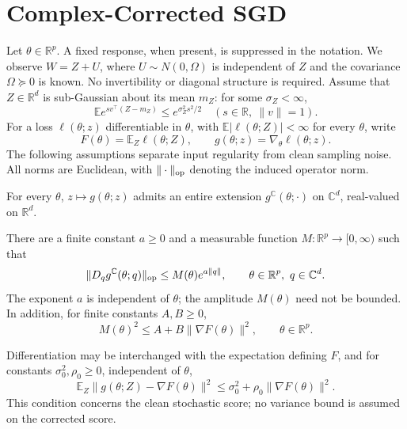 \section{Complex-Corrected SGD}
\label{sec:algorithm}

Let $\theta\in\mathbb R^p$. A fixed response, when present, is suppressed in the notation. We observe $W=Z+U$, where $U\sim N(0,\Omega)$ is independent of $Z$ and the covariance $\Omega\succeq0$ is known. No invertibility or diagonal structure is required. Assume that $Z\in\mathbb R^d$ is sub-Gaussian about its mean $m_Z$: for some $\sigma_Z<\infty$,
\[
\mathbb E e^{s v^\top(Z-m_Z)}\le e^{\sigma_Z^2s^2/2}
\quad(s\in\mathbb R,\ \|v\|=1).
\]
For a loss $\ell(\theta;z)$ differentiable in $\theta$, with
$\mathbb E|\ell(\theta;Z)|<\infty$ for every $\theta$, write
\[
F(\theta)=\mathbb E_Z\ell(\theta;Z),\qquad
g(\theta;z)=\nabla_\theta\ell(\theta;z).
\]
The following assumptions separate input regularity from clean sampling
noise. All norms are Euclidean, with $\|\cdot\|_{\rm op}$ denoting the
induced operator norm.

\begin{assumption}\label{ass:entire}
For every $\theta$, $z\mapsto g(\theta;z)$ admits an entire extension $g^{\mathbb C}(\theta;\cdot)$ on $\mathbb C^d$, real-valued on $\mathbb R^d$.
\end{assumption}

\begin{assumption}\label{ass:envelope}
There are a finite constant $a\ge0$ and a measurable function
$M:\mathbb R^p\to[0,\infty)$ such that
\begin{equation}\label{eq:parameter_envelope}
\|D_qg^{\mathbb C}(\theta;q)\|_{\rm op}
\le M(\theta)e^{a\|q\|},
\qquad \theta\in\mathbb R^p,\ q\in\mathbb C^d.
\end{equation}
The exponent $a$ is independent of $\theta$; the amplitude $M(\theta)$
need not be bounded.
In addition, for finite constants $A,B\ge0$,
\begin{equation}\label{eq:amplitude_control}
M(\theta)^2\le A+B\|\nabla F(\theta)\|^2,
\qquad \theta\in\mathbb R^p.
\end{equation}
\end{assumption}

\begin{assumption}\label{ass:clean_variance}
Differentiation may be interchanged with the expectation defining $F$,
and for constants $\sigma_0^2,\rho_0\ge0$, independent of $\theta$,
\[
\mathbb E_Z\|g(\theta;Z)-\nabla F(\theta)\|^2
\le\sigma_0^2+\rho_0\|\nabla F(\theta)\|^2.
\]
This condition concerns the clean stochastic score;
no variance bound is assumed on the corrected score.
\end{assumption}

